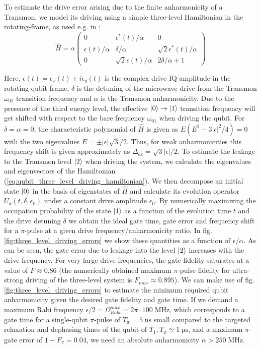 \smallskip

To estimate the drive error arising due to the finite anharmonicity of a Transmon, we model its driving using a simple three-level Hamiltonian in the rotating-frame, as used e.g. in \cite{motzoi_simple_2009}:
%
\begin{equation}
\hat{H} = \alpha\left(
						 \begin{array}{ccc}
						0 & \epsilon^*(t)/\alpha & 0 \\
						\epsilon(t)/\alpha & \delta/\alpha & \sqrt{2}\epsilon^*(t)/\alpha \\
						0 & \sqrt{2}\epsilon(t)/\alpha & 2\delta/\alpha + 1
						\end{array}
					\right) \label{eq:qubit_three_level_driving_hamiltonian}
\end{equation}
%

Here, $\epsilon(t) = \epsilon_x(t)+i\epsilon_y(t)$ is the complex drive IQ amplitude in the rotating qubit frame, $\delta$ is the detuning of the microwave drive from the Transmon $\omega_{01}$ transition frequency and $\alpha$ is the Transmon anharmonicity. Due to the presence of the third energy level, the effective $\left| 0 \right>\to\left| 1 \right>$ transition frequency will get shifted with respect to the bare frequency $\omega_{01}$ when driving the qubit. For $\delta = \alpha = 0$, the characteristic polynomial of $\hat{H}$ is given as $E(E^2-3|\epsilon|^2/4) = 0$ with the two eigenvalues $E=\pm |\epsilon|\sqrt{3}/2$. Thus, for weak anharmonicities this frequency shift is given approximately as $\Delta_{ac}=\sqrt{3}|\epsilon|/2$. To estimate the leakage to the Transmon level $\left| 2 \right>$ when driving the system, we calculate the eigenvalues and eigenvectors of the Hamiltonian (\ref{eq:qubit_three_level_driving_hamiltonian}). We then decompose an initial state $\left| 0 \right>$ in the basis of eigenstates of $\hat{H}$ and calculate its evolution operator $U_d(t,\delta,\epsilon_0)$ under a constant drive amplitude $\epsilon_0$. By numerically maximizing the occupation probability of the state $\left| 1 \right>$ as a function of the evolution time $t$ and the drive detuning $\delta$ we obtain the ideal gate time, gate error and frequency shift for a $\pi$-pulse at a given drive frequency/anharmonicity ratio. In fig. \ref{fig:three_level_driving_errors} we show these quantities as a function of $\epsilon/\alpha$. As can be seen, the gate error due to leakage into the level $\left| 2 \right>$ increases with the drive frequency. For very large drive frequencies, the gate fidelity saturates at a value of $F\approx 0.86$ (the numerically obtained maximum $\pi$-pulse fidelity for ultra-strong driving of the three-level system is $F_{max}\approx 0.895$). We can make use of fig. \ref{fig:three_level_driving_errors} to estimate the minimum required qubit anharmonicity given the desired gate fidelity and gate time. If we demand a maximum Rabi frequency $\epsilon/2=\Omega_{Rabi}^{max}=2\pi\cdot 100\;\mathrm{MHz}$, which corresponds to a gate time for a single-qubit $\pi$-pulse of $T_\pi=5\;\mathrm{ns}$ small compared to the targeted relaxation and dephasing times of the qubit of $T_1,T_\phi\simeq 1\;\mathrm{\mu s}$, and a maximum $\pi$-gate error of $1-F_\pi = 0.04$, we need an absolute anharmonicity $\alpha > 250\;\mathrm{MHz}$.

